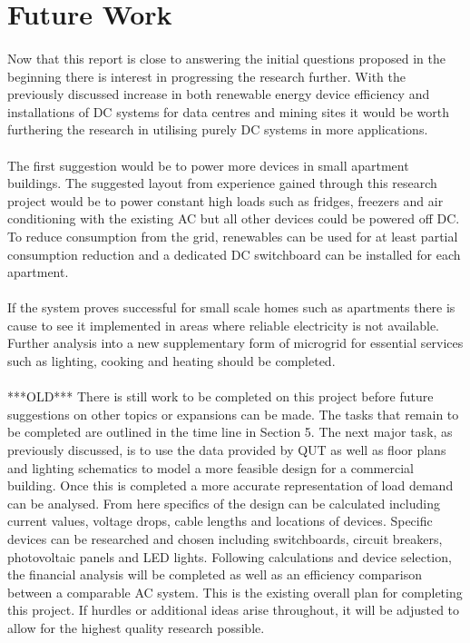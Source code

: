 \section{Future Work}

\paragraph{}
Now that this report is close to answering the initial questions proposed in the beginning there is interest in progressing the research further. With the previously discussed increase in both renewable energy device efficiency and installations of DC systems for data centres and mining sites it would be worth furthering the research in utilising purely DC systems in more applications. 

\paragraph{}
The first suggestion would be to power more devices in small apartment buildings. The suggested layout from experience gained through this research project would be to power constant high loads such as fridges, freezers and air conditioning with the existing AC but all other devices could be powered off DC. To reduce consumption from the grid, renewables can be used for at least partial consumption reduction and a dedicated DC switchboard can be installed for each apartment. 

\paragraph{}
If the system proves successful for small scale homes such as apartments there is cause to see it implemented in areas where reliable electricity is not available. Further analysis into a new supplementary form of microgrid for essential services such as lighting, cooking and heating should be completed. 

\paragraph{}
***OLD*** 
\newline 
There is still work to be completed on this project before future suggestions on other topics or expansions can be made. The tasks that remain to be completed are outlined in the time line in Section 5. The next major task, as previously discussed, is to use the data provided by QUT as well as floor plans and lighting schematics to model a more feasible design for a commercial building. Once this is completed a more accurate representation of load demand can be analysed. From here specifics of the design can be calculated including current values, voltage drops, cable lengths and locations of devices. Specific devices can be researched and chosen including switchboards, circuit breakers, photovoltaic panels and LED lights. Following calculations and device selection, the financial analysis will be completed as well as an efficiency comparison between a comparable AC system. This is the existing overall plan for completing this project. If hurdles or additional ideas arise throughout, it will be adjusted to allow for the highest quality research possible. 

\newpage